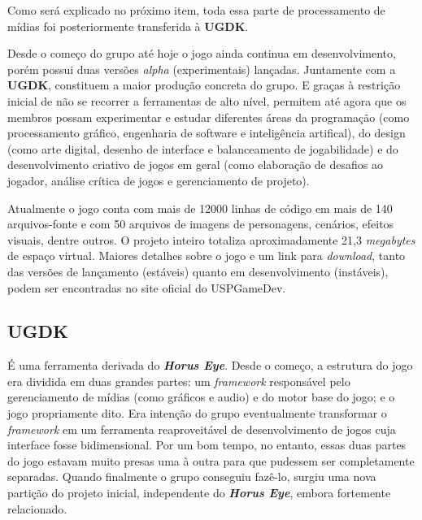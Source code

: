 \documentclass[12pt,onecolumn,a4paper]{article}
\begin{document}
        Como será explicado no próximo item, toda essa parte de processamento de mídias foi
        posteriormente transferida à \textbf{UGDK}.
        
        Desde o começo do grupo até hoje o jogo ainda continua em desenvolvimento, porém possui duas
        versões \textit{alpha} (experimentais) lançadas. Juntamente com a \textbf{UGDK}, constituem
        a maior produção concreta do grupo. E graças à restrição inicial de não se recorrer a
        ferramentas de alto nível, permitem até agora que os membros possam experimentar e estudar
        diferentes áreas da programação (como processamento gráfico, engenharia de software e
        inteligência artifical), do design (como arte digital, desenho de interface e balanceamento
        de jogabilidade) e do desenvolvimento criativo de jogos em geral (como elaboração de
        desafios ao jogador, análise crítica de jogos e gerenciamento de projeto).
        
        Atualmente o jogo conta com mais de 12000 linhas de código em mais de 140 arquivos-fonte e
        com 50 arquivos de imagens de personagens, cenários, efeitos visuais, dentre outros. O
        projeto inteiro totaliza aproximadamente 21,3 \textit{megabytes} de espaço virtual. Maiores
        detalhes sobre o jogo e um link para \textit{download}, tanto das versões de lançamento
        (estáveis) quanto em desenvolvimento (instáveis), podem ser encontradas no site oficial do
        USPGameDev.
    
    \clearpage
    \subsection{UGDK}
        É uma ferramenta derivada do \textit{\textbf{Horus Eye}}. Desde o começo, a estrutura do
        jogo era dividida em duas grandes partes: um \textit{framework} responsável pelo
        gerenciamento de mídias (como gráficos e audio) e do motor base do jogo; e o jogo
        propriamente dito. Era intenção do grupo eventualmente transformar o \textit{framework} em
        um ferramenta reaproveitável de desenvolvimento de jogos cuja interface fosse bidimensional.
        Por um bom tempo, no entanto, essas duas partes do jogo estavam muito presas uma à outra
        para que pudessem ser completamente separadas. Quando finalmente o grupo conseguiu fazê-lo,
        surgiu uma nova partição do projeto inicial, independente do \textit{\textbf{Horus Eye}},
        embora fortemente relacionado.
        
\end{document}
